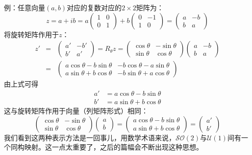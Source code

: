 例：任意向量$(a, b)$对应的复数对应的$2 \times 2$矩阵为：
\begin{equation}
\label{equ3.18}
z = a + ib = a
\begin{pmatrix}
	1 & 0 \\ 0 & 1
\end{pmatrix}
+ b
\begin{pmatrix}
	0 & -1 \\ 1 & 0
\end{pmatrix}
=
\begin{pmatrix}
	a & -b \\ b & a
\end{pmatrix}
\end{equation}
将旋转矩阵作用于$z$：
\begin{eqnarray}
\label{sec3.19}
	z' &=& \begin{pmatrix}
			a' & -b' \\ b' & a'
		 \end{pmatrix}
	= R_\theta z = 
		\begin{pmatrix}
			\cos \theta & -\sin \theta \\
			\sin \theta & \cos \theta
		\end{pmatrix}
		\begin{pmatrix}
			a & -b \\ b & a
		\end{pmatrix}
	\nonumber \\
	&=& \begin{pmatrix}
			a\cos\theta - b\sin \theta & - b\cos \theta - a \sin \theta \\
			a\sin \theta + b\cos \theta & -b \sin \theta + a \cos \theta
		\end{pmatrix}
\end{eqnarray}
由上式可得
\begin{align}
\label{equ3.20}
a' &= a \cos \theta - b \sin \theta \\
\label{equ3.21}
b' &= a \sin \theta + b \cos \theta
\end{align}
这与旋转矩阵作用于向量（列矩阵形式）相同：
\begin{equation}
\label{equ3.22}
	\begin{pmatrix}
		\cos \theta & -\sin \theta \\
		\sin \theta & \cos \theta
	\end{pmatrix}
	\begin{pmatrix}
		a \\ b
	\end{pmatrix}
	=
	\begin{pmatrix}
		a \cos \theta - b \sin \theta \\
		a \sin \theta + b \cos \theta
	\end{pmatrix}
	=
	\begin{pmatrix}
		a' \\ b'
	\end{pmatrix}
\end{equation}
我们看到这两种表示方法是一回事儿，用数学术语来说，$\mathcal{SO}(2)$与$\mathcal{U}(1)$间有一个同构映射。这一点太重要了，之后的篇幅会不断出现这种思想。

